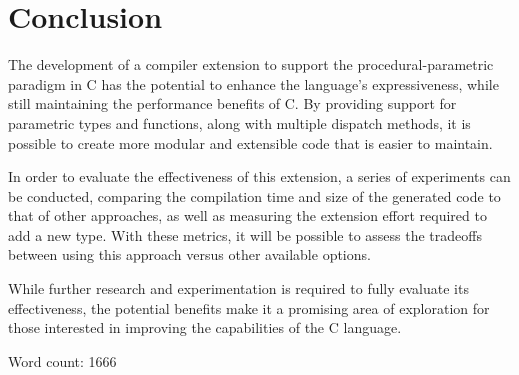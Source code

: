 \documentclass[conference]{IEEEtran}
\begin{document}
\section{Conclusion}

The development of a compiler extension to support the procedural-parametric paradigm in C has the potential to enhance the language's expressiveness, while still maintaining the performance benefits of C.
By providing support for parametric types and functions, along with multiple dispatch methods, it is possible to create more modular and extensible code that is easier to maintain.

In order to evaluate the effectiveness of this extension, a series of experiments can be conducted, comparing the compilation time and size of the generated code to that of other approaches, as well as measuring the extension effort required to add a new type.
With these metrics, it will be possible to assess the tradeoffs between using this approach versus other available options.

While further research and experimentation is required to fully evaluate its effectiveness, the potential benefits make it a promising area of exploration for those interested in improving the capabilities of the C language.




\begin{flushright}
  Word count: 1666
\end{flushright}
\end{document}
